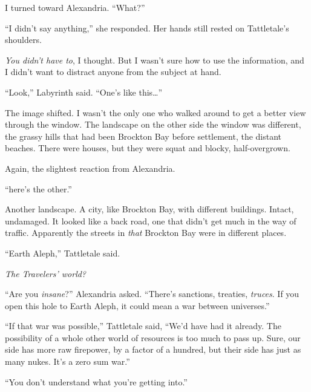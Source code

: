 I turned toward Alexandria.  ``What?''



``I didn't say anything,'' she responded.  Her hands still rested on Tattletale's shoulders.



\emph{You didn't have to}, I thought.  But I wasn't sure how to use the information, and I didn't want to distract anyone from the subject at hand.



``Look,'' Labyrinth said.  ``One's like this\ldots''



The image shifted.  I wasn't the only one who walked around to get a better view through the window.  The landscape on the other side the window was different, the grassy hills that had been Brockton Bay before settlement, the distant beaches.  There were houses, but they were squat and blocky, half-overgrown.



Again, the slightest reaction from Alexandria.



``\ldotsAnd here's the other.''



Another landscape.  A city, like Brockton Bay, with different buildings.  Intact, undamaged.  It looked like a back road, one that didn't get much in the way of traffic.  Apparently the streets in \emph{that} Brockton Bay were in different places.



``Earth Aleph,'' Tattletale said.



\emph{The Travelers' world?}



``Are you \emph{insane}?'' Alexandria asked.  ``There's sanctions, treaties, \emph{truces}.  If you open this hole to Earth Aleph, it could mean a war between universes.''



``If that war was possible,'' Tattletale said, ``We'd have had it already.  The possibility of a whole other world of resources is too much to pass up.  Sure, our side has more raw firepower, by a factor of a hundred, but their side has just as many nukes.  It's a zero sum war.''



``You don't understand what you're getting into.''



